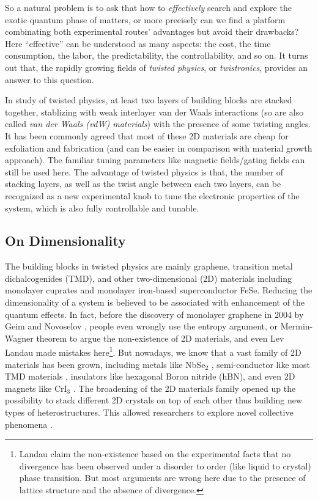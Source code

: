 So a natural problem is to ask that how to \emph{effectively} search and explore the exotic quantum phase of matters, or more precisely can we find a platform combinating both experimental routes' advantages but avoid their drawbacks? Here ``effective'' can be understood as many aspects: the cost, the time consumption, the labor, the predictability, the controllability, and so on. It turns out that, the rapidly growing fields of \emph{twisted physics}, or \emph{twistronics}, provides an answer to this question.


In study of twisted physics, at least two layers of building blocks are stacked together, stablizing with weak interlayer van der Waals interactions (so are also called \emph{van der Waals (vdW) materials}) with the presence of some twisting angles. It has been commonly agreed that most of these 2D materials are cheap for exfoliation and fabrication (and can be easier in comparison with material growth approach). The familiar tuning parameters like magnetic fields/gating fields can still be used here. The advantage of twisted physics is that, the number of stacking layers, as well as the twist angle between each two layers, can be recognized as a new experimental knob to tune the electronic properties of the system, which is also fully controllable and tunable.

\subsection{On Dimensionality}
The building blocks in twisted physics are mainly graphene, transition metal dichalcogenides (TMD), and other two-dimensional (2D) materials including monolayer cuprates and monolayer iron-based superconductor FeSe. Reducing the dimensionality of a system is believed to be associated with enhancement of the quantum effects. In fact, before the discovery of monolayer graphene in 2004 by Geim and Novoselov \cite{novoselov2004electric}, people even wrongly use the entropy argument, or Mermin-Wagner theorem to argue the non-existence of 2D materials, and even Lev Landau made mistakes here\footnote{Landau claim the non-existence based on the experimental facts that no divergence has been observed under a disorder to order (like liquid to crystal) phase transition. But most arguments are wrong here due to the presence of lattice structure and the absence of divergence.}. But nowadays, we know that a vast family of 2D materials has been grown, including metals like NbSe$_2$ \cite{tsen2016nature}, semi-conductor like most TMD materials \cite{manzeli20172d}, insulators like hexagonal Boron nitride (hBN), and even 2D magnets like CrI$_3$ \cite{huang2017layer,huang2018electrical}. The broadening of the 2D materials family opened up the possibility to stack different 2D crystals on top of each other thus building new types of heterostructures. This allowed researchers to explore novel collective phenomena \cite{novoselov20162d}.


